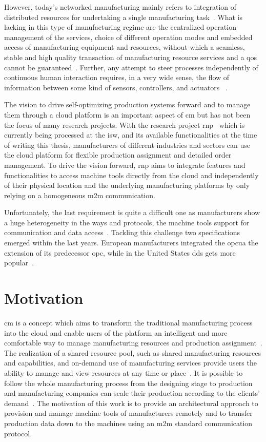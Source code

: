 \documentclass[
a4paper,
twoside,
headsepline,
cleardoublepage=empty,
parskip=half,
draft=false
]{scrbook}
\begin{document}
		However, today's networked manufacturing mainly refers to integration of distributed resources for undertaking a single manufacturing task~\cite{li2010cloud}.
		What is lacking in this type of manufacturing regime are the centralized operation management of the services, choice of different operation modes and embedded access of manufacturing equipment and resources, without which a seamless, stable and high quality transaction of manufacturing resource services and a \gls{qos} cannot be guaranteed~\cite{tao2010theory}.
		Further, any attempt to steer processes independently of continuous human interaction requires, in a very wide sense, the flow of information between some kind of sensors, controllers, and actuators ~\cite{sauter2011evolution}.
		
		The vision to drive self-optimizing production systems forward and to manage them through a cloud platform is an important aspect of \gls{cm} but has not been the focus of many research projects. 
		With the research project \gls{rnp}~\cite{ellwein2016} which is currently being processed at the \gls{isw}, and its available functionalities at the time of writing this thesis, manufacturers of different industries and sectors can use the cloud platform for flexible production assignment and detailed order management. 
		To drive the vision forward, \gls{rnp} aims to integrate features and functionalities to access machine tools directly from the cloud and independently of their physical location and the underlying manufacturing platforms by only relying on a homogeneous \gls{m2m} communication.
		
		Unfortunately, the last requirement is quite a difficult one as manufacturers show a huge heterogeneity in the ways and protocols, the machine tools support for communication and data access~\cite{xu2012cloud}.
		Tackling this challenge two specifications emerged within the last years.
		European manufacturers integrated the \gls{opcua} the extension of its predecessor \gls{opc}, while in the United States \gls{dds} gets more popular~\cite{niggemann2015data}.
		
		\section{Motivation}\label{sec:motivation}
		
			\gls{cm} is a concept which aims to transform the traditional manufacturing process into the cloud and enable users of the platform an intelligent and more comfortable way to manage manufacturing resources and production assignment~\cite{xu2012cloud}. 
			The realization of a shared resource pool, such as shared manufacturing resources and capabilities, and on-demand use of manufacturing services provide users the ability to manage and view resources at any time or place~\cite{tao2011cloud}. 
			It is possible to follow the whole manufacturing process from the designing stage to production and manufacturing companies can scale their production according to the clients' demand~\cite{tao2011cloud}. 
			The motivation of this work is to provide an architectural approach to provision and manage machine tools of manufacturers remotely and to transfer production data down to the machines using an \gls{m2m} standard communication protocol.
			
\end{document}
